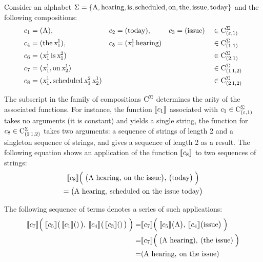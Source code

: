 \documentclass[../../document.tex]{subfiles}
\begin{document}
    \begin{example}\label{ex:lcfrs:comp}
        Consider an alphabet \(\Sigma=\{\text{A}, \text{hearing}, \text{is}, \text{scheduled}, \text{on}, \text{the}, \text{issue}, \text{today}\}\) and the following compositions:
        \begin{align*}
            c_1 &= (\text{A}), & c_2 &= (\text{today}), & c_3 &= (\text{issue}) && \in \mathrm{C}^\Sigma_{(\varepsilon, 1)} \\
            c_4 &= (\text{the} \, \textsl{x}_1^1), & c_5 &= (\textsl{x}_1^1 \, \text{hearing}) & & && \in \mathrm{C}^\Sigma_{(1,1)} \\
            c_6 &= (\textsl{x}_1^1 \, \text{is} \, \textsl{x}_1^2) && && && \in \mathrm{C}^\Sigma_{(2,1)} \\
            c_7 &= (\textsl{x}_1^1, \text{on} \, \textsl{x}_2^1) && && && \in \mathrm{C}^\Sigma_{(1\,1,2)}   \\
            c_8 &= (\textsl{x}_1^1, \text{scheduled} \, \textsl{x}_1^2 \, \textsl{x}_2^1) && && && \in \mathrm{C}^\Sigma_{(2\,1,2)}
        \end{align*}

        The subscript in the family of compositions \(\mathrm{C}^\Sigma\) determines the arity of the associated functions.
        For instance, the function \(\llbracket c_1\rrbracket\) associated with \(c_1 \in \mathrm{C}^\Sigma_{(\varepsilon, 1)}\) takes no arguments (it is constant) and yields a single string,
        the function for \(c_8 \in \mathrm{C}^\Sigma_{(2\,1, 2)}\) takes two arguments: a sequence of strings of length 2 and a singleton sequence of strings, and gives a sequence of length 2 as a result.
        The following equation shows an application of the function \(\llbracket c_8\rrbracket\) to two sequences of strings: 
        \begin{multline*}
            \llbracket c_8\rrbracket\Big( \; \big( \text{A hearing}, \: \text{on the issue} \big), \, \big( \text{today} \big) \; \Big)
            \\= \big( \text{A hearing}, \: \text{scheduled on the issue today} \big)
        \end{multline*}

        The following sequence of terms denotes a series of such applications:
        \begin{align*}
            \llbracket c_7\rrbracket\Big( \; \llbracket c_5\rrbracket\big(\,\llbracket c_1\rrbracket()\,\big), \: \llbracket c_4\rrbracket\big(\,\llbracket c_3\rrbracket()\,\big) \; \Big)
            =& \llbracket c_7\rrbracket\Big( \; \llbracket c_5\rrbracket\big(\text{A}\big), \: \llbracket c_4\rrbracket\big(\text{issue}\big) \; \Big) \\
            =& \llbracket c_7\rrbracket\Big( \; (\text{A hearing}), \: (\text{the issue}) \; \Big) \\
            =& (\text{A hearing}, \: \text{on the issue})
        \end{align*}
    \end{example}
\end{document}
